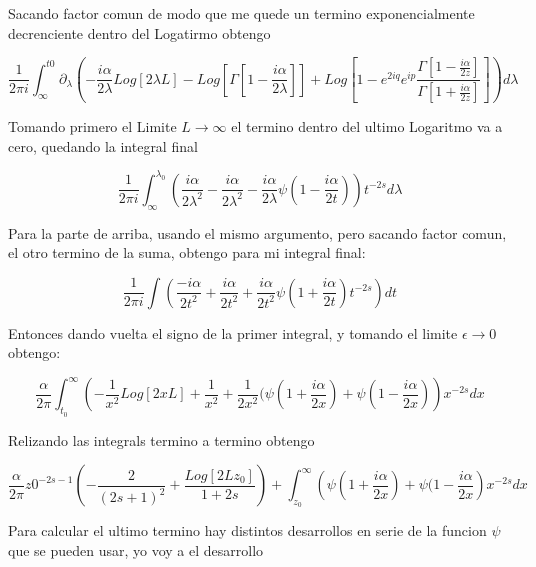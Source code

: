 Sacando factor comun de modo que me quede un termino exponencialmente decrenciente dentro del Logatirmo obtengo

\begin{equation}
\frac{1}{2 \pi i}  \int _{\infty} ^{t0} 
\partial _{\lambda}
\left(
-\frac{i\alpha}{2 \lambda} Log[2 \lambda L] - Log[\Gamma[1- \frac{i \alpha}{2 \lambda}]] +
Log[1- e ^{2 i q} e ^{i p} \frac{ \Gamma[1-\frac{i \alpha}{2 z }]}{ \Gamma[1+\frac{i \alpha}{2 z }]} ]
\right)
d \lambda
\end{equation}


Tomando primero el Limite $L \rightarrow \infty $ el termino dentro del ultimo Logaritmo va a cero, quedando la integral final 

\begin{equation}
\frac{1}{2 \pi i} \int _{\infty} ^{\lambda_0} 
\left(
\frac{i \alpha}{2 \lambda ^2} -
\frac{i \alpha}{2\lambda ^2} -
\frac{i \alpha}{2 \lambda } \psi (1 - \frac{i \alpha}{2 t}) 
\right)
t ^{-2s} d \lambda
\end{equation}

Para la parte de arriba, usando el mismo argumento, pero sacando factor comun, el otro termino de la suma, obtengo para mi integral final:

\begin{equation}
\frac{1}{2 \pi i} \int 
\left(
\frac{- i \alpha}{2 t^2} + 
\frac{i \alpha}{2 t^2} +
\frac{i \alpha}{2 t^2} \psi (1+\frac{i \alpha}{2 t}) 
t ^{-2s} 
\right)
dt
\end{equation}

Entonces dando vuelta el signo de la primer integral, y tomando el limite $\epsilon \rightarrow 0$ obtengo:

\begin{equation}
\frac{\alpha}{2 \pi } \int _{t_0} ^{\infty}
\left(
- \frac{1}{x ^2} Log[2 x L ] +
\frac{1}{ x^2} +
\frac{1}{ 2 x^2} ( \psi (1+ \frac{i \alpha}{2 x}) + \psi (1 - \frac{i \alpha}{2 x})
\right)
x ^{-2s}
dx
\end{equation}

Relizando las integrals termino a termino obtengo

\begin{equation}
\frac{\alpha}{2 \pi} z0 ^{-2s-1}
\left(
- \frac{2}{(2s+1) ^2} +
\frac{Log[2 L z _0]}{1+2s}
\right) +
\int _{z_0} ^{\infty} 
\left(
\psi(1 + \frac{i \alpha}{2 x}) +
\psi(1 - \frac{i \alpha}{2 x}
\right)
x ^{-2s}
dx
\end{equation}


Para calcular el ultimo termino hay distintos desarrollos en serie de la funcion $\psi $ que se pueden usar, yo voy a el desarrollo 

